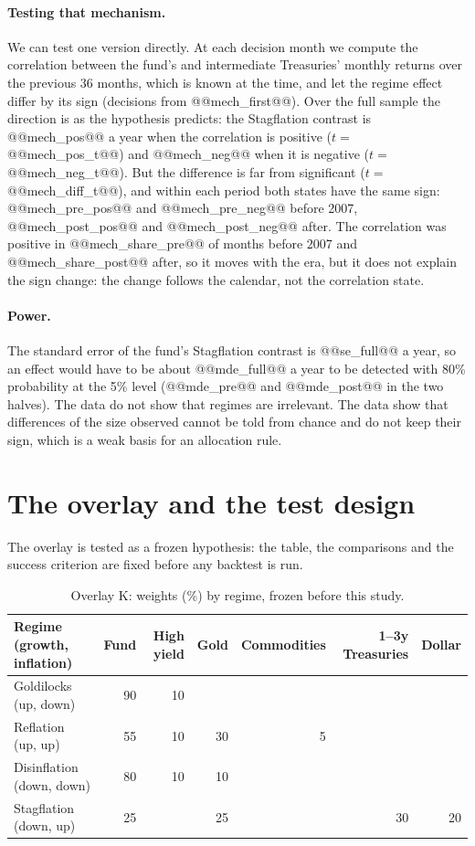 \documentclass[11pt,a4paper]{article}
\begin{document}
\paragraph{Testing that mechanism.} We can test one version directly. At each decision month we compute the
correlation between the fund's and intermediate Treasuries' monthly returns over the previous 36 months, which is
known at the time, and let the regime effect differ by its sign (decisions from @@mech_first@@). Over the full sample
the direction is as the hypothesis predicts: the Stagflation contrast is @@mech_pos@@ a year when the correlation is
positive ($t=$ @@mech_pos_t@@) and @@mech_neg@@ when it is negative ($t=$ @@mech_neg_t@@). But the difference is far from
significant ($t=$ @@mech_diff_t@@), and within each period both states have the same sign: @@mech_pre_pos@@ and
@@mech_pre_neg@@ before 2007, @@mech_post_pos@@ and @@mech_post_neg@@ after. The correlation was positive in
@@mech_share_pre@@ of months before 2007 and @@mech_share_post@@ after, so it moves with the era, but it does not explain the
sign change: the change follows the calendar, not the correlation state.

\paragraph{Power.} The standard error of the fund's Stagflation contrast is @@se_full@@ a year, so an effect would
have to be about @@mde_full@@ a year to be detected with 80\% probability at the 5\% level (@@mde_pre@@ and
@@mde_post@@ in the two halves). The data do not show that regimes are irrelevant. The data show that differences of
the size observed cannot be told from chance and do not keep their sign, which is a weak basis for an
allocation rule.

\section{The overlay and the test design}
\label{sec:design}

The overlay is tested as a frozen hypothesis: the table, the comparisons and the success criterion are fixed before any backtest is run.


\begin{table}[htbp]
\centering
\caption{Overlay K: weights (\%) by regime, frozen before this study.}
\label{tab:k}
\small
\begin{tabular}{@{}lrrrrrr@{}}
\toprule
Regime (growth, inflation) & Fund & High yield & Gold & Commodities & 1--3y Treasuries & Dollar \\
\midrule
Goldilocks (up, down) & 90 & 10 & & & & \\
Reflation (up, up) & 55 & 10 & 30 & 5 & & \\
Disinflation (down, down) & 80 & 10 & 10 & & & \\
Stagflation (down, up) & 25 & & 25 & & 30 & 20 \\
\bottomrule
\end{tabular}
\end{table}
\end{document}
